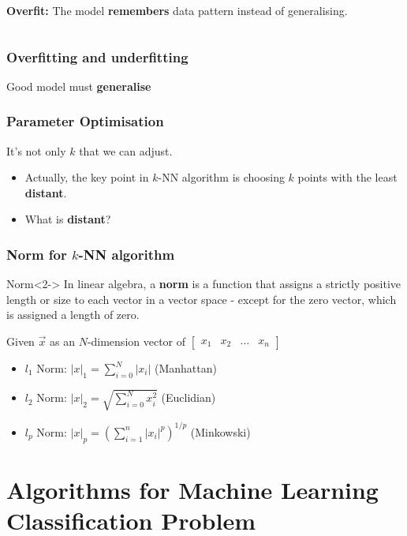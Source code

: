 \documentclass[aspectratio=169]{beamer}
\begin{document}
\begin{frame}
\begin{columns}[t]
		 \textbf{Overfit:} The model \textbf{remembers} data pattern instead of generalising.
	\end{columns}
\end{frame}

\begin{frame}
	\frametitle{Overfitting and underfitting}
	\begin{center}
		{\LARGE Good model must \textbf{generalise}}\\
	\end{center}
\end{frame}

\begin{frame}
	\frametitle{Parameter Optimisation}
	 It's not only $k$ that we can adjust.
	\begin{itemize}
		\item<3-> Actually, the key point in $k$-NN algorithm is choosing $k$ points with the least \textbf{distant}.
		\item<4-> What is \textbf{distant}?
	\end{itemize}
\end{frame}

\begin{frame}
	\frametitle{Norm for $k$-NN algorithm}
	\begin{block}{Norm}<2->
		In linear algebra, a \textbf{norm} is a function that assigns a strictly positive length or size to each vector in a vector space - except for the zero vector, which is assigned a length of zero.
	\end{block}

	 Given $\vec{x}$ as an $N$-dimension vector of $\begin{bmatrix}
			x_1 & x_2 & \hdots & x_n
		\end{bmatrix}$
	\begin{itemize}
		\item<4-> $l_1$ Norm: $\left|x\right|_1 = \sum_{i=0}^{N}\left|x_i\right|$ (Manhattan)
		\item<5-> $l_2$ Norm: $\left|x\right|_2 = \sqrt{\sum_{i=0}^{N}x_i^2}$ (Euclidian)
		\item<6-> $l_p$ Norm: $\left|x\right|_p = \left(\sum_{i=1}^n |x_i|^p\right)^{1/p}$ (Minkowski)
	\end{itemize}
\end{frame}

\section{Algorithms for Machine Learning Classification Problem}
\end{document}
